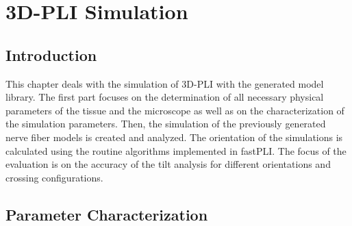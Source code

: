 \cleardoublepage
\setcounter{chapter}{8}
\chapter{\acs{3D-PLI} Simulation}
\label{cha:simulation_analysis}
%
\section{Introduction}
%
This chapter deals with the simulation of \ac{3D-PLI} with the generated model library.
The first part focuses on the determination of all necessary physical parameters of the tissue and the microscope as well as on the characterization of the simulation parameters.
Then, the simulation of the previously generated nerve fiber models is created and analyzed.
The orientation of the simulations is calculated using the routine algorithms implemented in \ac{fastPLI}.
The focus of the evaluation is on the accuracy of the tilt analysis for different orientations and crossing configurations.
%
%
%
\section{Parameter Characterization}\label{sec:sim_choose_parameters}
%
